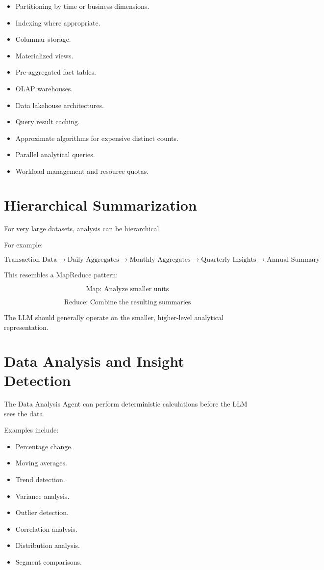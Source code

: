 \documentclass[11pt,a4paper]{article}
\begin{document}
\begin{itemize}
    \item Partitioning by time or business dimensions.
    \item Indexing where appropriate.
    \item Columnar storage.
    \item Materialized views.
    \item Pre-aggregated fact tables.
    \item OLAP warehouses.
    \item Data lakehouse architectures.
    \item Query result caching.
    \item Approximate algorithms for expensive distinct counts.
    \item Parallel analytical queries.
    \item Workload management and resource quotas.
\end{itemize}

\section{Hierarchical Summarization}

For very large datasets, analysis can be hierarchical.

For example:

\[
\text{Transaction Data}
\rightarrow
\text{Daily Aggregates}
\rightarrow
\text{Monthly Aggregates}
\rightarrow
\text{Quarterly Insights}
\rightarrow
\text{Annual Summary}
\]

This resembles a MapReduce pattern:

\[
\text{Map: Analyze smaller units}
\]

\[
\text{Reduce: Combine the resulting summaries}
\]

The LLM should generally operate on the smaller, higher-level analytical
representation.

\section{Data Analysis and Insight Detection}

The Data Analysis Agent can perform deterministic calculations before the
LLM sees the data.

Examples include:

\begin{itemize}
    \item Percentage change.
    \item Moving averages.
    \item Trend detection.
    \item Variance analysis.
    \item Outlier detection.
    \item Correlation analysis.
    \item Distribution analysis.
    \item Segment comparisons.
\end{itemize}
\end{document}
